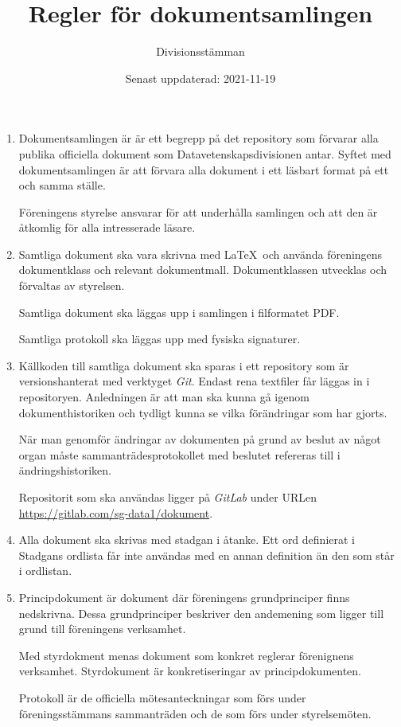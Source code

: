 \documentclass{dvd}
\begin{document}
	\title{Regler för dokumentsamlingen}
	\author{Divisionsstämman}
	\date{Senast uppdaterad: 2021-11-19}

	\begin{enumerate}[label=\arabic* §, ref=\arabic*]
		\item Dokumentsamlingen är är ett begrepp på det repository som förvarar alla publika officiella dokument som Datavetenskapsdivisionen antar.
		Syftet med dokumentsamlingen är att förvara alla dokument i ett läsbart format på ett och samma ställe.

		Föreningens styrelse ansvarar för att underhålla samlingen och att den är åtkomlig för alla intresserade läsare.
		
		\item Samtliga dokument ska vara skrivna med \LaTeX~och använda föreningens dokumentklass och relevant dokumentmall.
		Dokumentklassen utvecklas och förvaltas av styrelsen.

		Samtliga dokument ska läggas upp i samlingen i filformatet PDF.

		Samtliga protokoll ska läggas upp med fysiska signaturer.
		
		\item Källkoden till samtliga dokument ska sparas i ett repository som är versionshanterat med verktyget \emph{Git}.
		Endast rena textfiler får läggas in i repositoryen.
		Anledningen är att man ska kunna gå igenom dokumenthistoriken och tydligt kunna se vilka förändringar som har gjorts.

		När man genomför ändringar av dokumenten på grund av beslut av något organ måste sammanträdesprotokollet med beslutet refereras till i ändringshistoriken.

		Repositorit som ska användas ligger på \emph{GitLab} under URLen \url{https://gitlab.com/sg-data1/dokument}.
		
		\item Alla dokument ska skrivas med stadgan i åtanke.
		Ett ord definierat i Stadgans ordlista får inte användas med en annan definition än den som står i ordlistan.

		\item Principdokument är dokument där föreningens grundprinciper finns nedskrivna.
		Dessa grundprinciper beskriver den andemening som ligger till grund till föreningens verksamhet.

		Med styrdokment menas dokument som konkret reglerar förenignens verksamhet.
		Styrdokument är konkretiseringar av principdokumenten.

		Protokoll är de officiella mötesanteckningar som förs under föreningsstämmans sammanträden och de som förs under styrelsemöten.
	\end{enumerate}
\end{document}
